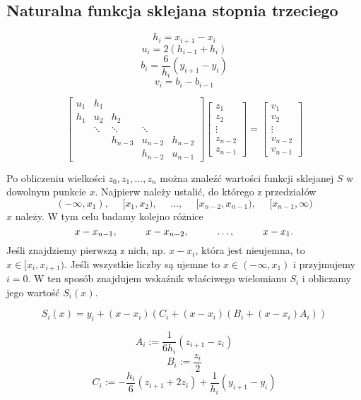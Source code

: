 \documentclass[../mn-notatki.tex]{subfiles}
\begin{document}
\subsection{Naturalna funkcja sklejana stopnia trzeciego}
\begin{tcolorbox}
\[
h_i = x_{i+1} - x_i
\]
\[
u_i = 2(h_{i-1} + h_i)
\]
\[
b_i = \frac{6}{h_i}(y_{i+1}-y_i)
\]
\[
v_i = b_i - b_{i-1}
\]
\end{tcolorbox}

\begin{tcolorbox}
\[
\begin{bmatrix}
u_1 & h_1    &         &         &\\
h_1 & u_2    & h_2     &         &\\
    & \ddots & \ddots  & \ddots  &\\
    &        & h_{n-3} & u_{n-2} & h_{n-2} \\
    &        &         & h_{n-2} & u_{n-1}
\end{bmatrix}
\begin{bmatrix}
z_1 \\
z_2 \\
\vdots \\
z_{n-2}\\
z_{n-1}
\end{bmatrix}
=
\begin{bmatrix}
v_1 \\
v_2 \\
\vdots \\
v_{n-2}\\
v_{n-1}
\end{bmatrix}
\]
\end{tcolorbox}

Po obliczeniu wielkości $z_0, z_1, \ldots, z_n$ można znaleźć wartości funkcji
sklejanej $S$ w dowolnym punkcie $x$. Najpierw należy ustalić, do którego
z przedziałów
\begin{equation*}
(-\infty, x_1),
~~~~~~ [ x_1, x_2),
~~~~~~ \ldots,
~~~~~~ [x_{n-2}, x_{n-1}),
~~~~~~ [x_{n-1}, \infty)
\end{equation*}
$x$ należy. W tym celu badamy kolejno różnice
\[
x - x_{n-1}, \hspace*{1cm} x - x_{n-2}, \hspace*{1cm} \ldots, \hspace*{1cm} x-x_1.
\]
Jeśli znajdziemy pierwszą z nich, np. $x - x_i$, która jest nieujemna, to
$x \in [x_i, x_{i+1})$. Jeśli wszystkie liczby są ujemne to $x \in (-\infty, x_1)$
i przyjmujemy $i = 0$. W ten sposób znajdujem wskaźnik właściwego wielomianu
$S_i$ i obliczamy jego wartość $S_i(x)$.

\begin{tcolorbox}
\[
S_i(x) = y_i + (x-x_i)\left(  C_i + (x-x_i) (B_i + (x-x_i) A_i ) \right)
\]
\end{tcolorbox}
\begin{tcolorbox}
\[
A_i := \frac{1}{6h_i}(z_{i+1}-z_i)
\]
\[
B_i := \frac{z_i}{2}
\]
\[
C_i := -\frac{h_i}{6}(z_{i+1} + 2z_i) + \frac{1}{h_i} (y_{i+1} - y_i)
\]
\end{tcolorbox}


\pagebreak
\end{document}
